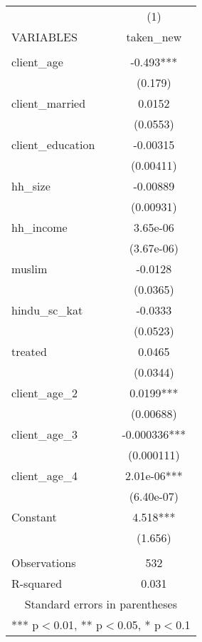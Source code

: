 \begin{tabular}{lc} \hline
 & (1) \\
VARIABLES & taken\_new \\ \hline
 &  \\
client\_age & -0.493*** \\
 & (0.179) \\
client\_married & 0.0152 \\
 & (0.0553) \\
client\_education & -0.00315 \\
 & (0.00411) \\
hh\_size & -0.00889 \\
 & (0.00931) \\
hh\_income & 3.65e-06 \\
 & (3.67e-06) \\
muslim & -0.0128 \\
 & (0.0365) \\
hindu\_sc\_kat & -0.0333 \\
 & (0.0523) \\
treated & 0.0465 \\
 & (0.0344) \\
client\_age\_2 & 0.0199*** \\
 & (0.00688) \\
client\_age\_3 & -0.000336*** \\
 & (0.000111) \\
client\_age\_4 & 2.01e-06*** \\
 & (6.40e-07) \\
Constant & 4.518*** \\
 & (1.656) \\
 &  \\
Observations & 532 \\
 R-squared & 0.031 \\ \hline
\multicolumn{2}{c}{ Standard errors in parentheses} \\
\multicolumn{2}{c}{ *** p$<$0.01, ** p$<$0.05, * p$<$0.1} \\
\end{tabular}
